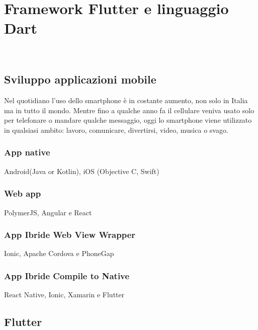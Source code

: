
\chapter{Framework Flutter e linguaggio Dart}
\label{cap:Framework Flutter e linguaggio Dart}

\\

\section{Sviluppo applicazioni mobile}
Nel quotidiano l'uso dello smartphone è in costante aumento, non solo in Italia ma in tutto il mondo.
Mentre fino a qualche anno fa il cellulare veniva usato solo per telefonare o mandare qualche messaggio, oggi lo smartphone viene utilizzato in qualsiasi ambito: lavoro, comunicare, divertirsi, video, musica o svago.
\subsection{App native}
Android(Java or Kotlin), iOS (Objective C, Swift)
\subsection{Web app}
PolymerJS, Angular e React
\subsection{App Ibride Web View Wrapper}
Ionic, Apache Cordova e PhoneGap
\subsection{App Ibride Compile to Native}
React Native, Ionic, Xamarin e Flutter

\section{Flutter}

